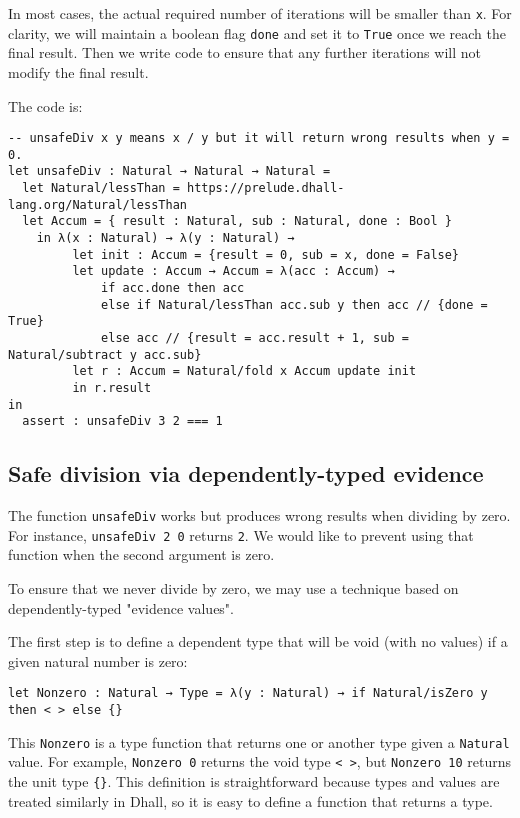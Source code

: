 In most cases, the actual required number of iterations will be smaller than \lstinline!x!.
For clarity, we will maintain a boolean flag \lstinline!done! and set it to \lstinline!True! once we reach the final result.
Then we write code to ensure that any further iterations will not modify the final result. 


The code is:


\begin{lstlisting}[language=Dhall]
-- unsafeDiv x y means x / y but it will return wrong results when y = 0.
let unsafeDiv : Natural → Natural → Natural =
  let Natural/lessThan = https://prelude.dhall-lang.org/Natural/lessThan
  let Accum = { result : Natural, sub : Natural, done : Bool }
    in λ(x : Natural) → λ(y : Natural) →
         let init : Accum = {result = 0, sub = x, done = False}
         let update : Accum → Accum = λ(acc : Accum) →
             if acc.done then acc
             else if Natural/lessThan acc.sub y then acc // {done = True}
             else acc // {result = acc.result + 1, sub = Natural/subtract y acc.sub}
         let r : Accum = Natural/fold x Accum update init
         in r.result
in
  assert : unsafeDiv 3 2 === 1
\end{lstlisting}


\subsection{Safe division via dependently-typed evidence}


The function \lstinline!unsafeDiv! works but produces wrong results when dividing by zero.
For instance, \lstinline!unsafeDiv 2 0! returns \lstinline!2!.
We would like to prevent using that function when the second argument is zero.


To ensure that we never divide by zero, we may use a technique based on dependently-typed "evidence values".


The first step is to define a dependent type that will be void (with no values) if a given natural number is zero:


\begin{lstlisting}[language=Dhall]
let Nonzero : Natural → Type = λ(y : Natural) → if Natural/isZero y then < > else {}
\end{lstlisting}


This \lstinline!Nonzero! is a type function that returns one or another type given a \lstinline!Natural! value.
For example, \lstinline!Nonzero 0! returns the void type \lstinline!< >!, but \lstinline!Nonzero 10! returns the unit type \lstinline!{}!.
This definition is straightforward because types and values are treated similarly in Dhall, so it is easy to define a function that returns a type.


